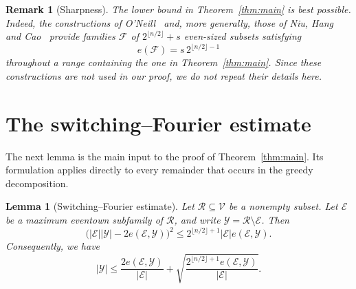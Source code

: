 \documentclass[11pt]{article}
\newtheorem{lemma}[theorem]{Lemma}
\newtheorem{remark}[theorem]{Remark}
\begin{document}
\begin{remark}[Sharpness]\label{rem:sharpness}
The lower bound in Theorem~\ref{thm:main} is best possible. Indeed,
the constructions of O'Neill~\cite{ONeill} and, more generally, those of
Niu, Hang and Cao~\cite{NiuHangCao} provide families \(\mathcal F\) of
\(2^{\lfloor n/2\rfloor}+s\) even-sized subsets satisfying
\[
e(\mathcal F)=s\,2^{\lfloor n/2\rfloor-1}
\]
throughout a range containing the one in Theorem~\ref{thm:main}.
Since these constructions are not used in our proof, we do not repeat
their details here.
\end{remark}

\section{The switching--Fourier estimate}\label{sec:switching}

The next lemma is the main input to the proof of
Theorem~\ref{thm:main}.  Its formulation applies directly to every remainder
that occurs in the greedy decomposition.

\begin{lemma}[Switching--Fourier estimate]\label{lem:switching-fourier}
Let \(\mathcal R\subseteq\mathcal V\) be a nonempty subset. Let \(\mathcal E\) be a
maximum eventown subfamily of \(\mathcal R\), and write \(\mathcal Y=\mathcal R\setminus\mathcal E\). 
Then
\begin{equation}
 \bigl(|\mathcal E||\mathcal Y|-2e(\mathcal E,\mathcal Y)\bigr)^2
 \le
 2^{\lfloor n/2\rfloor+1}|\mathcal E|e(\mathcal E,\mathcal Y).
\label{eq:switching-fourier}
\end{equation}
Consequently, we have
\begin{equation}
 |\mathcal Y|
 \le
 \frac{2e(\mathcal E,\mathcal Y)}{|\mathcal E|}
 +
 \sqrt{
       \frac{2^{\lfloor n/2\rfloor+1}e(\mathcal E,\mathcal Y)}{|\mathcal E|}
      }.
\label{eq:remainder-bound}
\end{equation}
\end{lemma}
\end{document}
